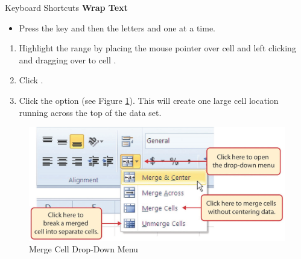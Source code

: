 \begin{center}
	\begin{shtcutbox}{Keyboard Shortcuts}
		\textbf{Wrap Text}
		\\
		\begin{itemize}
			\setlength{\itemsep}{0pt}
			\setlength{\parskip}{0pt}
			\setlength{\parsep}{0pt}
			
			\item Press the  key and then the letters  and  one at a time.
			
		\end{itemize}
	\end{shtcutbox}
\end{center}

\begin{enumerate}[resume]
	\item Highlight the range  by placing the mouse pointer over cell  and left clicking and dragging over to cell .
	\item Click .
	\item Click the  option (see Figure \ref{01:fig39}). This will create one large cell location running across the top of the data set.

\end{enumerate}

\begin{figure}[H]
	\centering
	\includegraphics[width=\maxwidth{.95\linewidth}]{gfx/ch01_fig39}
	\caption{Merge Cell Drop-Down Menu}
	\label{01:fig39}
\end{figure}

